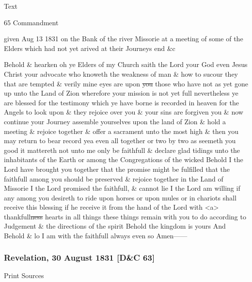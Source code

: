 {			\begin{description}
				\item[Text]
			\end{description}
			
				\begin{tightcenter}
				65 Commandment
				\end{tightcenter}
				
				given Aug 13 1831 on the Bank of the river Missorie at a meeting of some of the Elders which had not yet arived at their Journeys end \&c
				
				Behold \& hearken oh ye Elders of my Church saith the Lord your God even Jesus Christ your advocate who knoweth the weakness of man \& how to sucour they that are tempted \& verily mine eyes are upon \sout{you} those who have not as yet gone up unto the Land of Zion wherefore your mission is not yet full nevertheless ye are blessed for the testimony which ye have borne is recorded in heaven for the Angels to look upon \& they rejoice over you \& your sins are forgiven you \& now continue your Journey assemble yourselves upon the land of Zion \& hold a meeting \& rejoice together \& offer a sacrament unto the most high \& then you may return to bear record yea even all together or two by two as seemeth you good it mattereth not unto me only be faithfull \& declare glad tidings unto the inhabitants of the Earth or among the Congregations of the wicked Behold I the Lord have brought you together that the promise might be fulfilled that the faithfull among you should be preserved \& rejoice together in the Land of Missorie I the Lord promised the faithfull, \& cannot lie I the Lord am willing if any among you desireth to ride upon horses or upon mules or in chariots shall receive this blessing if he receive it from the hand of the Lord with <a> thankfull\sout{ness} hearts in all things these things remain with you to do according to Judgement \& the directions of the spirit Behold the kingdom is yours And Behold \& lo I am with the faithfull always even so Amen------
				
		\subsubsection{Revelation, 30 August 1831 [D\&C 63]}
			\label{EMS-1831-JS-30-AUG-1831}
		
			\begin{description}
				\item[Print Sources]
			\end{description}

}
